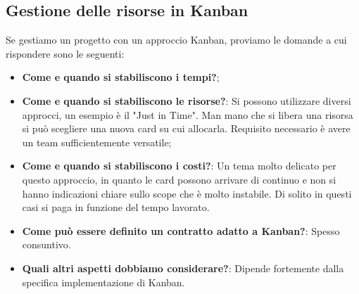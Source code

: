\subsection{Gestione delle risorse in Kanban}
Se gestiamo un progetto con un approccio Kanban, proviamo le domande a cui rispondere sono le seguenti:
\begin{itemize}
	\item \textbf{Come e quando si stabiliscono i tempi?};
	\item \textbf{Come e quando si stabiliscono le risorse?}: Si possono utilizzare diversi approcci, un esempio è il "Just in Time". Man mano che si libera una risorsa si può scegliere una nuova card su cui allocarla. Requisito necessario è avere un team sufficientemente versatile;
	\item \textbf{Come e quando si stabiliscono i costi?}: Un tema molto delicato per questo approccio, in quanto le card possono arrivare di continuo e non si hanno indicazioni chiare sullo scope che è molto instabile. Di solito in questi casi si paga in funzione del tempo lavorato.
	\item \textbf{Come può essere definito un contratto adatto a Kanban?}: Spesso consuntivo.
	\item \textbf{Quali altri aspetti dobbiamo considerare?}: Dipende fortemente dalla specifica implementazione di Kanban.
\end{itemize}

